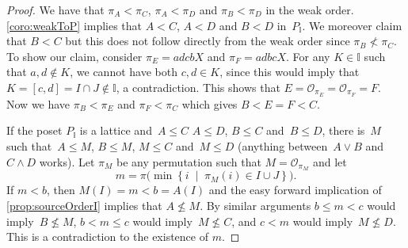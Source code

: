 \documentclass{amsart}
\theoremstyle{definition}
\newcommand{\set}[2]{\left\{ #1 \;\middle|\; #2 \right\}} %
\newcommand{\vincent}[1]{\todo[size=\tiny,color=blue!30]{ #1 \\ \hfill --- V.}\,}
\newcommand{\meet}{\wedge} %
\newcommand{\join}{\vee} %
\newcommand{\Or}{\mathcal O}  %
\newcommand{\II}{\mathbb I} %
\begin{document}
\begin{proof}
We have that $\pi_A < \pi_C$, $\pi_A < \pi_D$ and $\pi_B < \pi_D$ in the weak order.
\cref{coro:weakToP} implies that $A < C$, $A < D$ and $B < D$ in~$P_\II$.
We moreover claim that $B < C$  but this does not follow directly from the weak order since $\pi_B\not<\pi_C$.
To show our claim, consider $\pi_E=adcbX$ and $\pi_F=adbcX$.
For any $K\in \II$ such that $a,d\not\in K$, we cannot have both $c,d\in K$, since this would imply that $K=[c,d]=I\cap J\not\in \II$, a contradiction.
This shows that $E=\Or_{\pi_E}=\Or_{\pi_F}=F$.
Now we have $\pi_B<\pi_E$ and $\pi_F<\pi_C$ which gives $B<E=F<C$.
 
 If the poset $P_\II$ is a lattice and~$A \le C$ $A \le D$, $B \le C$ and~$B \le D$, there is~$M$ such that~$A \le M$, $B \le M$, $M \le C$ and~$M \le D$ (anything between~$A \join B$ and~$C \meet D$ works).
Let $\pi_M$ be any permutation such that $M=\Or_{\pi_M}$ and let  
\[
m=\pi \big( \min\set{i}{\pi_M(i)\in I\cup J} \big).
\]
If $m<b$, then $M(I) = m < b = A(I)$ and the easy forward implication of \cref{prop:sourceOrderI} implies that $A\not\le M$.
By similar arguments $b\le m<c$ would imply~$B\not\le M$, $b< m\le c$ would imply~$M\not\le C$, and $c<m$ would imply~$M\not\le D$.
This is a contradiction to the existence of $m$.
\end{proof}
\end{document}
